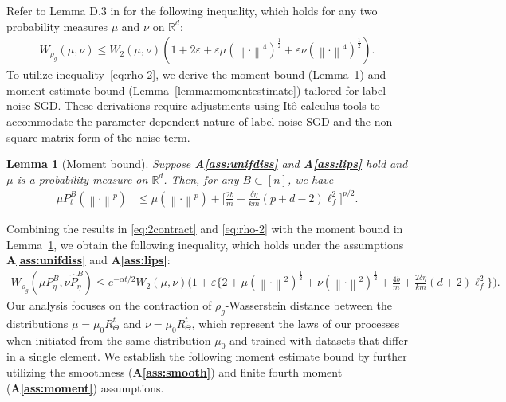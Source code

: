 \documentclass{article}
\newcommand{\norm}[1]{\left\lVert#1\right\rVert} %
\newtheorem{lemma}{Lemma}
\begin{document}
Refer to Lemma D.3 in \citet{Farghly} for the following inequality, which holds for any two probability measures $\mu$ and $\nu$ on $\mathbb{R}^d$:
\begin{align}\label{eq:rho-2}
    W_{\rho_g} (\mu, \nu) \leq W_2 (\mu, \nu) (1\!+\!2\varepsilon \!+\! \varepsilon\mu(\norm{\cdot}^4)^{\frac{1}{2}} \!+\! \varepsilon\nu(\norm{\cdot}^4)^{\frac{1}{2}}).
\end{align} 
To utilize inequality~\eqref{eq:rho-2}, we derive the moment bound (Lemma~\ref{lemma:moment}) and moment estimate bound (Lemma~\ref{lemma:momentestimate}) tailored for label noise SGD. These derivations require adjustments using It\^o calculus tools to accommodate the parameter-dependent nature of label noise SGD and the non-square matrix form of the noise term.

\begin{lemma}[Moment bound]\label{lemma:moment}
    Suppose \textbf{A\ref{ass:unifdiss}} and \textbf{A\ref{ass:lips}} hold and $\mu$ is a probability measure on $\mathbb{R}^d$. Then, for any $B \subset [n]$, we have
    \begin{align*}
        \mu P_t^B (\norm{\cdot}^p) 	&\leq \mu (\norm{\cdot}^p) + \bigg[\frac{2b}{m} +\frac{\delta \eta}{km} (p+d-2)   \ell_f^2\bigg]^{p/2}.
    \end{align*}
\end{lemma}
Combining the results in \eqref{eq:2contract} and \eqref{eq:rho-2} with the moment bound in Lemma~\ref{lemma:moment}, we obtain the following inequality, which holds under the assumptions \textbf{A\ref{ass:unifdiss}} and \textbf{A\ref{ass:lips}}:
\begin{align*}
    W_{\rho_g} (\mu P_\eta^B, \nu \widehat{P}_\eta^B)
    \!\leq \!e^{-\alpha t / 2} W_2(\mu, \nu) \bigg(\!1 \!+\! \varepsilon \bigg\{2 \!+\! \mu(\norm{\cdot}^2)^{\frac{1}{2}}
    + \nu(\norm{\cdot}^2)^{\frac{1}{2}}\!+\! \frac{4b}{m} \!+\! \frac{2\delta \eta}{km} (d \!+\!2) \ell_f^2\bigg\}\bigg).
\end{align*}
Our analysis focuses on the contraction of $\rho_g$-Wasserstein distance between the distributions $\mu=\mu_0 R_\Theta^t$ and $\nu  = \mu_0 R_\Theta^t$, which represent the laws of our processes when initiated from the same distribution $\mu_0$ and trained with datasets that differ in a single element. We establish the following moment estimate bound by further utilizing the smoothness (\textbf{A\ref{ass:smooth}}) and finite fourth moment (\textbf{A\ref{ass:moment}}) assumptions.
\end{document}
